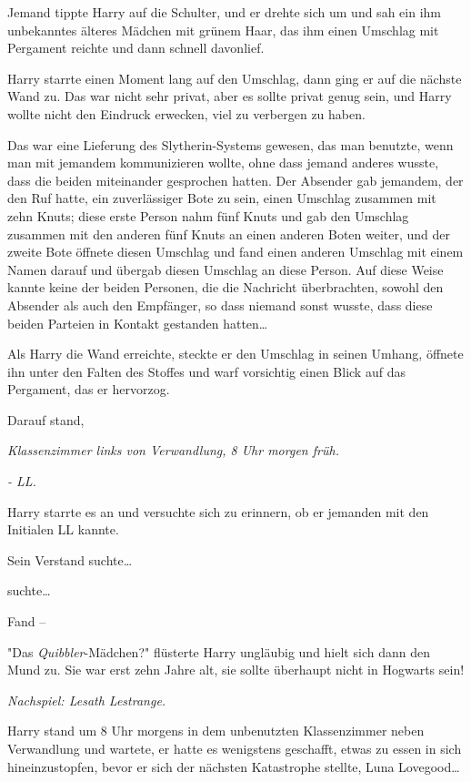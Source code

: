 {Jemand tippte Harry auf die Schulter, und er drehte sich um und sah ein ihm unbekanntes älteres Mädchen mit grünem Haar, das ihm einen Umschlag mit Pergament reichte und dann schnell davonlief.

Harry starrte einen Moment lang auf den Umschlag, dann ging er auf die nächste Wand zu. Das war nicht sehr privat, aber es sollte privat genug sein, und Harry wollte nicht den Eindruck erwecken, viel zu verbergen zu haben.

Das war eine Lieferung des Slytherin-Systems gewesen, das man benutzte, wenn man mit jemandem kommunizieren wollte, ohne dass jemand anderes wusste, dass die beiden miteinander gesprochen hatten. Der Absender gab jemandem, der den Ruf hatte, ein zuverlässiger Bote zu sein, einen Umschlag zusammen mit zehn Knuts; diese erste Person nahm fünf Knuts und gab den Umschlag zusammen mit den anderen fünf Knuts an einen anderen Boten weiter, und der zweite Bote öffnete diesen Umschlag und fand einen anderen Umschlag mit einem Namen darauf und übergab diesen Umschlag an diese Person. Auf diese Weise kannte keine der beiden Personen, die die Nachricht überbrachten, sowohl den Absender als auch den Empfänger, so dass niemand sonst wusste, dass diese beiden Parteien in Kontakt gestanden hatten…

Als Harry die Wand erreichte, steckte er den Umschlag in seinen Umhang, öffnete ihn unter den Falten des Stoffes und warf vorsichtig einen Blick auf das Pergament, das er hervorzog.

Darauf stand,

\emph{\emph{Klassenzimmer links von Verwandlung, 8 Uhr morgen} \emph{früh.}}

\emph{- LL.}

Harry starrte es an und versuchte sich zu erinnern, ob er jemanden mit den Initialen LL kannte.

Sein Verstand suchte…

suchte…

Fand --

"Das \emph{Quibbler}-Mädchen?" flüsterte Harry ungläubig und hielt sich dann den Mund zu. Sie war erst zehn Jahre alt, sie sollte überhaupt nicht in Hogwarts sein!

\emph{Nachspiel: Lesath Lestrange.}

Harry stand um 8 Uhr morgens in dem unbenutzten Klassenzimmer neben Verwandlung und wartete, er hatte es wenigstens geschafft, etwas zu essen in sich hineinzustopfen, bevor er sich der nächsten Katastrophe stellte, Luna Lovegood…

}
